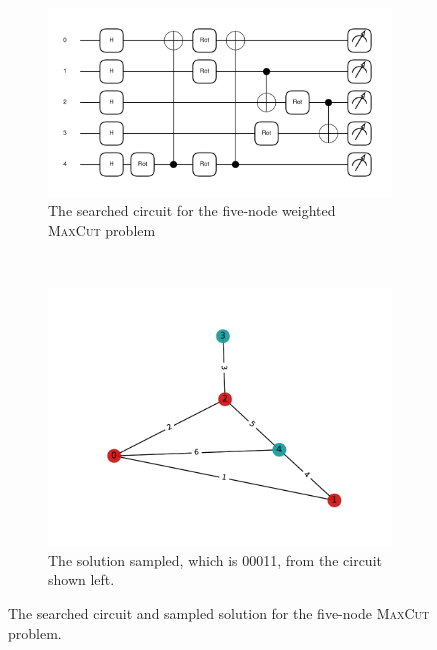 \documentclass[a4paper,onecolumn,11pt]{quantumarticle}
\begin{document}
\begin{figure}[H]
    \centering
    \begin{subfigure}[b]{0.48\textwidth}
        \includegraphics[width=\textwidth]{Figures/fig_qaoa_5q_circ.pdf}
        \caption{The searched circuit for the five-node weighted \textsc{MaxCut} problem}
        \label{fig:qaoa_5q_circ}
    \end{subfigure}
    ~ %
    \begin{subfigure}[b]{0.46\textwidth}
        \includegraphics[width=\textwidth]{Figures/fig_maxcut_5q_res_00011.pdf}
        \caption{The solution sampled, which is 00011, from the circuit shown left.}
        \label{fig:qaoa_5q_solution}
    \end{subfigure}
    \caption{The searched circuit and sampled solution for the five-node \textsc{MaxCut} problem.}\label{fig:qaoa_5q_circ_and_solution}
\end{figure}
\end{document}
